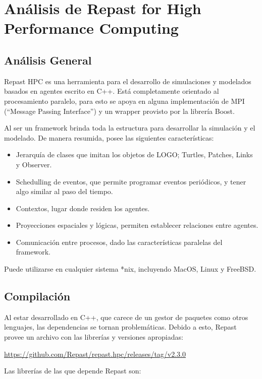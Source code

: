 \section{Análisis de Repast for High Performance Computing}

\subsection{Análisis General}

Repast HPC es una herramienta para el desarrollo de simulaciones y
modelados basados en agentes escrito en C++. Está completamente
orientado al procesamiento paralelo, para esto se apoya en alguna
implementación de MPI (``Message Passing Interface'') y un wrapper
provisto por la librería Boost.

Al ser un framework brinda toda la estructura para desarrollar la
simulación y el modelado. De manera resumida, posee las siguientes
características:

\begin{itemize}
	\tightlist
	\item
	Jerarquía de clases que imitan los objetos de LOGO; Turtles, Patches,
	Links y Observer.
	\item
	Schedulling de eventos, que permite programar eventos periódicos, y
	tener algo similar al paso del tiempo.
	\item
	Contextos, lugar donde residen los agentes.
	\item
	Proyecciones espaciales y lógicas, permiten establecer relaciones
	entre agentes.
	\item
	Comunicación entre procesos, dado las características paralelas del
	framework.
\end{itemize}

Puede utilizarse en cualquier sistema *nix, incluyendo MacOS, Linux y
FreeBSD.

\subsection{Compilación}

Al estar desarrollado en C++, que carece de un gestor de paquetes como
otros lenguajes, las dependencias se tornan problemáticas. Debido a
esto, Repast provee un archivo con las librerías y versiones apropiadas:

\url{https://github.com/Repast/repast.hpc/releases/tag/v2.3.0}

Las librerías de las que depende Repast son:


